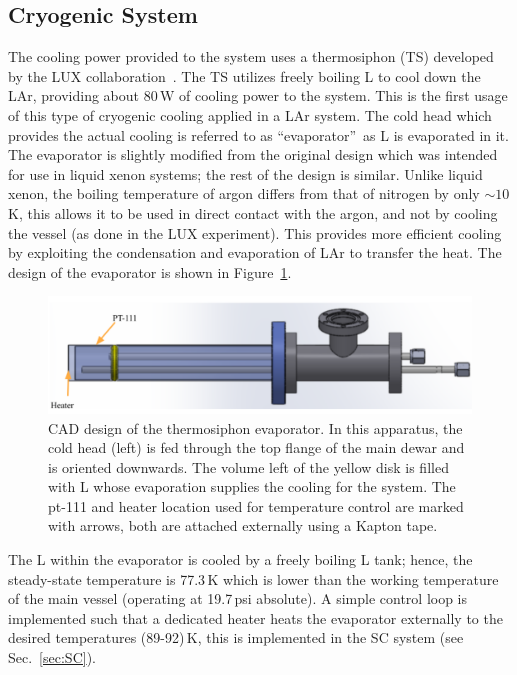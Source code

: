 \documentclass[a4paper,12pt]{article}
\newcommand{\quotes}[1]{``{#1}''}
\begin{document}
\subsection{Cryogenic System}
\label{sec:TS}

The cooling power provided to the system uses a  thermosiphon (TS) developed by the LUX collaboration~\cite{5204619,Akerib:2012ys}.  The TS utilizes freely boiling L to cool down the LAr, providing about 80\,W of cooling power to the system.  This is the first usage of this type of cryogenic cooling applied in a LAr system. The cold head which provides the actual cooling is referred to as \quotes{evaporator}\ as L is evaporated in it. The evaporator is slightly modified from the original design which was intended for use in liquid xenon systems; the rest of the design is similar. Unlike liquid xenon, the boiling temperature of argon differs from that of nitrogen by only $\sim10$\,K, this allows it to be used in direct contact with the argon, and not by cooling the vessel (as done in the LUX experiment).  This provides more efficient cooling by exploiting the condensation and evaporation of LAr to transfer the heat. The design of the evaporator is shown in Figure~\ref{fig:TS}. 

\begin{figure}[htb]
\centerline{\includegraphics[width=0.75\linewidth]{evaporator.png}}

\caption{CAD design of the thermosiphon evaporator.  In this apparatus, the cold head (left) is fed through the top flange of the main dewar and is oriented downwards. The volume left of the yellow disk is filled with L whose evaporation supplies the cooling for the system. The pt-111 and heater location used for temperature control are marked with arrows, both are attached externally using a Kapton tape.}
\label{fig:TS}
\end{figure}

The L within the evaporator is cooled by a freely boiling L tank; hence, the steady-state temperature is 77.3\,K which is lower than the working temperature of the main vessel (operating at 19.7\,psi absolute). A simple control loop is implemented such that a dedicated heater heats the evaporator externally to the desired temperatures (89-92)\,K, this is implemented in the SC system (see Sec.~\ref{sec:SC}).
\end{document}

